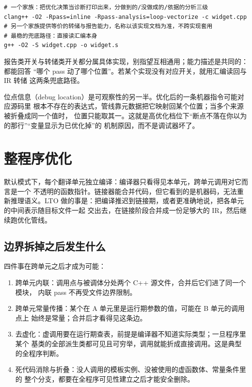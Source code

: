 \documentclass[12pt,a4paper,fontset=fandol]{ctexbook}
\newcommand{\Lang}[1]{\textsf{#1}}
\newcommand{\CPP}{\Lang{C++}}
\newcommand{\Mx}[1]{\textsf{#1}}
\begin{document}
\begin{lstlisting}[style=shellstyle, caption={可观察性用法：决策报告与汇编读回（示意命令）}]
# 一个家族：把优化决策当诊断打印出来，分做到的/没做成的/依据的分析三级
clang++ -O2 -Rpass=inline -Rpass-analysis=loop-vectorize -c widget.cpp
# 另一个家族提供等价的转储与报告能力，名称以该实现文档为准，不跨实现套用
# 最稳的兜底路径：直接读汇编本身
g++ -O2 -S widget.cpp -o widget.s
\end{lstlisting}

报告类开关与转储类开关都分属具体实现，别指望互相通用；能力描述是共同的：都能回答
“哪个 \Mx{pass} 动了哪个位置”。若某个实现没有对应开关，就用汇编读回与 \Mx{IR} 转储
这两条兜底路径。

位点信息（debug location）是可观察性的另一半。优化后的一条机器指令可能对应源码里
根本不存在的表达式，管线靠元数据把它映射回某个位置；当多个来源被折叠成同一个值时，
位置只能取其一。这就是高优化档位下“断点不落在你以为的那行”“变量显示为已优化掉”的
机制原因，而不是调试器坏了。

\section{整程序优化}\label{sec:cl05-lto}

默认模式下，每个翻译单元独立编译：编译器只看得见本单元，跨单元调用对它而言是一个
不透明的函数指针。链接器能合并代码，但它看到的是机器码，无法重新推理语义。\Mx{LTO}
做的事是：把编译推迟到链接期，或者更准确地说，把各单元的中间表示随目标文件一起
交出去，在链接阶段合并成一份足够大的 \Mx{IR}，然后继续跑优化管线。

\subsection{边界拆掉之后发生什么}\label{sec:cl05-ltobenefit}

四件事在跨单元之后才成为可能：

\begin{enumerate}
  \item 跨单元内联：调用点与被调体分处两个 \CPP{} 源文件，合并后它们进了同一个模块，
        内联 \Mx{pass} 不再受文件边界限制。
  \item 跨单元常量传播：某个在 A 单元里是运行期参数的值，可能在 B 单元的调用点上
        始终是常量；合并后才看得见这条边。
  \item 去虚化：虚调用要在运行期查表，前提是编译器不知道实际类型；一旦程序里某个
        基类的全部派生类都可见且可穷举，调用就能折成直接调用。这是典型的全程序判断。
  \item 死代码消除与折叠：没人调用的模板实例、没被使用的虚函数体、常量条件里的
        整个分支，都要在全程序可见性建立之后才能安全删除。
\end{enumerate}
\end{document}
